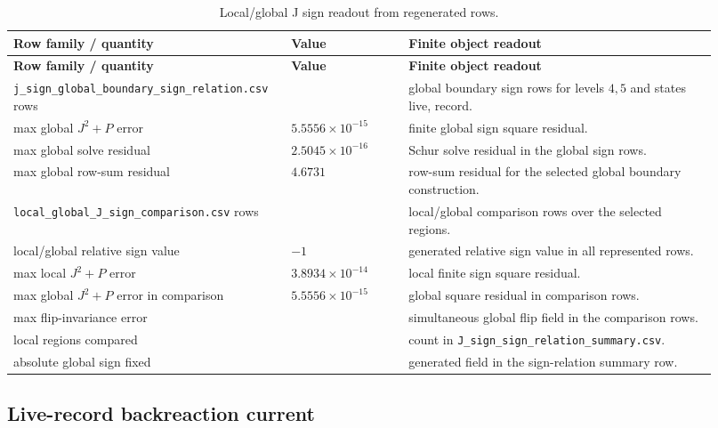 \documentclass[11pt]{article}
\theoremstyle{remark}
\newcommand{\code}[1]{\texttt{#1}}
\numberwithin{equation}{section}
\begin{document}
\begin{longtable}{>{\raggedright\arraybackslash}p{0.34\linewidth}>{\raggedleft\arraybackslash}p{0.16\linewidth}>{\raggedright\arraybackslash}p{0.42\linewidth}}
\caption{Local/global J sign readout from regenerated rows.}\label{tab:local-global-j-readout}\\
\toprule
\textbf{Row family / quantity} & \textbf{Value} & \textbf{Finite object readout}\\
\midrule
\endfirsthead
\toprule
\textbf{Row family / quantity} & \textbf{Value} & \textbf{Finite object readout}\\
\midrule
\endhead
\code{j\_\allowbreak{}sign\_\allowbreak{}global\_\allowbreak{}boundary\_\allowbreak{}sign\_\allowbreak{}relation.csv} rows & 16 & global boundary sign rows for levels $4,5$ and states live, record.\\
\hline
max global $J^2+P$ error & $5.5556\times10^{-15}$ & finite global sign square residual.\\
\hline
max global solve residual & $2.5045\times10^{-16}$ & Schur solve residual in the global sign rows.\\
\hline
max global row-sum residual & $4.6731$ & row-sum residual for the selected global boundary construction.\\
\hline
\code{local\_global\_J\_sign\_comparison.csv} rows & 8 & local/global comparison rows over the selected regions.\\
\hline
local/global relative sign value & $-1$ & generated relative sign value in all represented rows.\\
\hline
max local $J^2+P$ error & $3.8934\times10^{-14}$ & local finite sign square residual.\\
\hline
max global $J^2+P$ error in comparison & $5.5556\times10^{-15}$ & global square residual in comparison rows.\\
\hline
max flip-invariance error & 0 & simultaneous global flip field in the comparison rows.\\
\hline
local regions compared & 8 & count in \code{J\_sign\_sign\_relation\_summary.csv}.\\
\hline
absolute global sign fixed & 0 & generated field in the sign-relation summary row.\\
\bottomrule
\end{longtable}



\subsection{Live-record backreaction current}\label{sec:live-record-backreaction-current}
\end{document}

